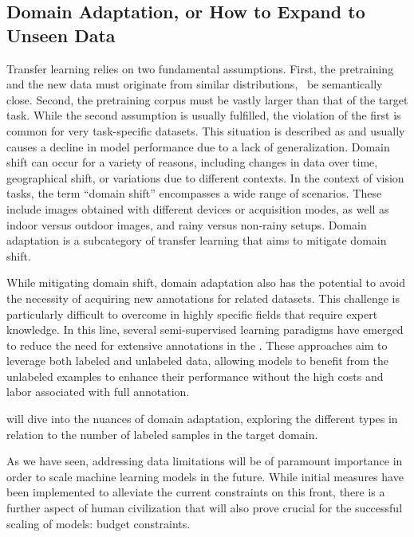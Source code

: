 \subsection{Domain Adaptation, or How to Expand to Unseen Data}
Transfer learning relies on two fundamental assumptions. First, the pretraining and the new data must originate from similar distributions, \ie~be semantically close. Second, the pretraining corpus must be vastly larger than that of the target task. While the second assumption is usually fulfilled, the violation of the first is common for very task-specific datasets. This situation is described as  and usually causes a decline in model performance due to a lack of generalization. Domain shift can occur for a variety of reasons, including changes in data over time, geographical shift, or variations due to different contexts. In the context of vision tasks, the term ``domain shift'' encompasses a wide range of scenarios. These include images obtained with different devices or acquisition modes, as well as indoor versus outdoor images, and rainy versus non-rainy setups. Domain adaptation is a subcategory of transfer learning that aims to mitigate domain shift.

While mitigating domain shift, domain adaptation also has the potential to avoid the necessity of acquiring new annotations for related datasets. This challenge is particularly difficult to overcome in highly specific fields that require expert knowledge. In this line, several semi-supervised learning paradigms have emerged to reduce the need for extensive annotations in the . These approaches aim to leverage both labeled and unlabeled data, allowing models to benefit from the unlabeled examples to enhance their performance without the high costs and labor associated with full annotation. 


 will dive into the nuances of domain adaptation, exploring the different types in relation to the number of labeled samples in the target domain.

\sectionline

As we have seen, addressing data limitations will be of paramount importance in order to scale machine learning models in the future. While initial measures have been implemented to alleviate the current constraints on this front, there is a further aspect of human civilization that will also prove crucial for the successful scaling of models: budget constraints.
